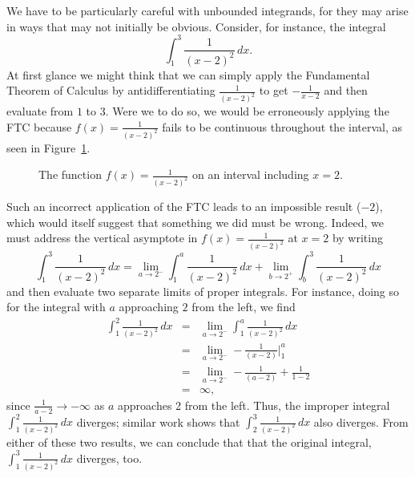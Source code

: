 We have to be particularly careful with unbounded integrands, for they may arise in ways that may not initially be obvious.  Consider, for instance, the integral
$$\int_1^3 \frac{1}{(x-2)^2} \, dx.$$
At first glance we might think that we can simply apply the Fundamental Theorem of Calculus by antidifferentiating $\frac{1}{(x-2)^2}$ to get $-\frac{1}{x-2}$ and then evaluate from $1$ to $3$.  Were we to do so, we would be erroneously applying the FTC because $f(x) = \frac{1}{(x-2)^2}$ fails to be continuous throughout the interval, as seen in Figure~\ref{F:6.5.InfIntegrand2}.

\begin{figure}[h]
\begin{center}
\caption{The function $f(x) = \frac{1}{(x-2)^2}$ on an interval including $x = 2$.} \label{F:6.5.InfIntegrand2}
\end{center}
\end{figure}

Such an incorrect application of the FTC leads to an impossible result ($-2$), which would itself suggest that something we did must be wrong.  Indeed, we must address the vertical asymptote in $f(x) = \frac{1}{(x-2)^2}$ at $x = 2$ by writing
$$\int_1^3 \frac{1}{(x-2)^2} \, dx = \lim_{a \to 2^-} \int_1^a \frac{1}{(x-2)^2} \, dx + \lim_{b \to 2^+} \int_b^3 \frac{1}{(x-2)^2} \, dx$$
and then evaluate two separate limits of proper integrals.  For instance, doing so for the integral with $a$ approaching $2$ from the left, we find 
\begin{eqnarray*}
\int_1^2 \frac{1}{(x-2)^2} \, dx & = & \lim_{a \to 2^-} \int_1^a \frac{1}{(x-2)^2} \, dx \\
						& = & \lim_{a \to 2^-} -\frac{1}{(x-2)} \bigg\vert_1^a \\
						& = & \lim_{a \to 2^-} -\frac{1}{(a-2)} + \frac{1}{1-2} \\
						& = & \infty,
\end{eqnarray*}
since $\frac{1}{a-2} \to -\infty$ as $a$ approaches 2 from the left.  Thus, the improper integral $\int_1^2 \frac{1}{(x-2)^2} \, dx$ diverges; similar work shows that $\int_2^3 \frac{1}{(x-2)^2} \, dx$ also diverges.  From either of these two results, we can conclude that  that the original integral, $\int_1^3 \frac{1}{(x-2)^2} \, dx$ diverges, too.  

